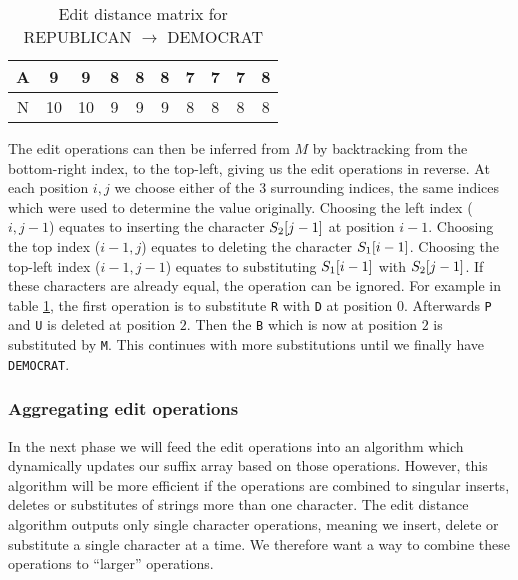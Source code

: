 \begin{table}
\begin{center}
\begin{tabular}[c]{c|c|c|c|c|c|c|c|c|c|}
			A & 9                    & 9                    & 8                    & 8                    & 8                    & 7                    & 7                    & \cellcolor{blue!25}7 & 8                    \\\hline
			N & 10                   & 10                   & 9                    & 9                    & 9                    & 8                    & 8                    & 8                    & \cellcolor{blue!25}8 \\\hline

			\hline
		\end{tabular}
	\end{center}
	\caption{Edit distance matrix for REPUBLICAN $\rightarrow$ DEMOCRAT}
	\label{tab:wagnerfischermatrix}
\end{table}


The edit operations can then be inferred from $M$ by backtracking from the bottom-right
index, to the top-left, giving us the edit operations in reverse. At each position $i, j$
we choose either of the 3 surrounding indices, the same indices which were used to
determine the value originally. Choosing the left index ($i, j - 1$) equates to inserting
the character $S_2[{j - 1}]$ at position $i - 1$. Choosing the top index ($i -
1, j$) equates to deleting the character $S_1[{i - 1}]$. Choosing the top-left
index ($i - 1, j - 1$) equates to substituting $S_1[{i - 1}]$ with
$S_2[{j - 1}]$. If these characters are already equal, the operation can be
ignored. For example in table \ref{tab:wagnerfischermatrix}, the first operation is to
substitute \verb|R| with \verb|D| at position $0$. Afterwards \verb|P| and \verb|U| is
deleted at position $2$. Then the \verb|B| which is now at position $2$ is substituted by
\verb|M|. This continues with more substitutions until we finally have \verb|DEMOCRAT|.


\subsubsection{Aggregating edit operations}

In the next phase we will feed the edit operations into an algorithm which dynamically
updates our suffix array based on those operations. However, this algorithm will be more
efficient if the operations are combined to singular inserts, deletes or substitutes of
strings more than one character. The edit distance algorithm outputs only single character
operations, meaning we insert, delete or substitute a single character at a time. We
therefore want a way to combine these operations to ``larger'' operations.

